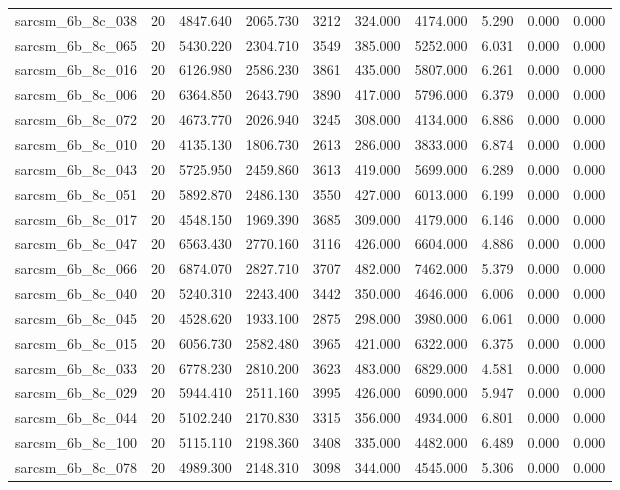 \begin{tabular}{lrrrrrrrrr}
sarcsm\_6b\_8c\_038 & 20 & 4847.640 & 2065.730 & 3212 & 324.000 & 4174.000 & 5.290 & 0.000 & 0.000 \\
sarcsm\_6b\_8c\_065 & 20 & 5430.220 & 2304.710 & 3549 & 385.000 & 5252.000 & 6.031 & 0.000 & 0.000 \\
sarcsm\_6b\_8c\_016 & 20 & 6126.980 & 2586.230 & 3861 & 435.000 & 5807.000 & 6.261 & 0.000 & 0.000 \\
sarcsm\_6b\_8c\_006 & 20 & 6364.850 & 2643.790 & 3890 & 417.000 & 5796.000 & 6.379 & 0.000 & 0.000 \\
sarcsm\_6b\_8c\_072 & 20 & 4673.770 & 2026.940 & 3245 & 308.000 & 4134.000 & 6.886 & 0.000 & 0.000 \\
sarcsm\_6b\_8c\_010 & 20 & 4135.130 & 1806.730 & 2613 & 286.000 & 3833.000 & 6.874 & 0.000 & 0.000 \\
sarcsm\_6b\_8c\_043 & 20 & 5725.950 & 2459.860 & 3613 & 419.000 & 5699.000 & 6.289 & 0.000 & 0.000 \\
sarcsm\_6b\_8c\_051 & 20 & 5892.870 & 2486.130 & 3550 & 427.000 & 6013.000 & 6.199 & 0.000 & 0.000 \\
sarcsm\_6b\_8c\_017 & 20 & 4548.150 & 1969.390 & 3685 & 309.000 & 4179.000 & 6.146 & 0.000 & 0.000 \\
sarcsm\_6b\_8c\_047 & 20 & 6563.430 & 2770.160 & 3116 & 426.000 & 6604.000 & 4.886 & 0.000 & 0.000 \\
sarcsm\_6b\_8c\_066 & 20 & 6874.070 & 2827.710 & 3707 & 482.000 & 7462.000 & 5.379 & 0.000 & 0.000 \\
sarcsm\_6b\_8c\_040 & 20 & 5240.310 & 2243.400 & 3442 & 350.000 & 4646.000 & 6.006 & 0.000 & 0.000 \\
sarcsm\_6b\_8c\_045 & 20 & 4528.620 & 1933.100 & 2875 & 298.000 & 3980.000 & 6.061 & 0.000 & 0.000 \\
sarcsm\_6b\_8c\_015 & 20 & 6056.730 & 2582.480 & 3965 & 421.000 & 6322.000 & 6.375 & 0.000 & 0.000 \\
sarcsm\_6b\_8c\_033 & 20 & 6778.230 & 2810.200 & 3623 & 483.000 & 6829.000 & 4.581 & 0.000 & 0.000 \\
sarcsm\_6b\_8c\_029 & 20 & 5944.410 & 2511.160 & 3995 & 426.000 & 6090.000 & 5.947 & 0.000 & 0.000 \\
sarcsm\_6b\_8c\_044 & 20 & 5102.240 & 2170.830 & 3315 & 356.000 & 4934.000 & 6.801 & 0.000 & 0.000 \\
sarcsm\_6b\_8c\_100 & 20 & 5115.110 & 2198.360 & 3408 & 335.000 & 4482.000 & 6.489 & 0.000 & 0.000 \\
sarcsm\_6b\_8c\_078 & 20 & 4989.300 & 2148.310 & 3098 & 344.000 & 4545.000 & 5.306 & 0.000 & 0.000 \\

\end{tabular}
